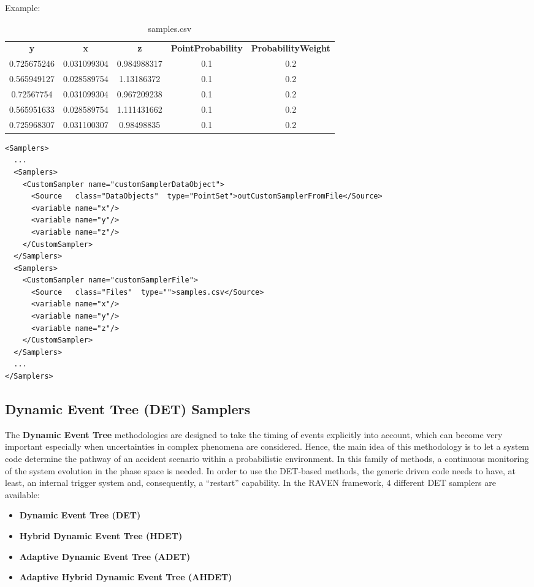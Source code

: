 Example:
\begin{table}[h!]
\centering
\caption{samples.csv}
\begin{tabular}{ccccc}
\textbf{y}  & \textbf{x}  & \textbf{z}  & \textbf{PointProbability} & \textbf{ProbabilityWeight} \\
0.725675246 & 0.031099304 & 0.984988317 & 0.1                       & 0.2                        \\
0.565949127 & 0.028589754 & 1.13186372  & 0.1                       & 0.2                        \\
0.72567754  & 0.031099304 & 0.967209238 & 0.1                       & 0.2                        \\
0.565951633 & 0.028589754 & 1.111431662 & 0.1                       & 0.2                        \\
0.725968307 & 0.031100307 & 0.98498835  & 0.1                       & 0.2
\end{tabular}
\end{table}
\begin{lstlisting}[style=XML]
<Samplers>
  ...
  <Samplers>
    <CustomSampler name="customSamplerDataObject">
      <Source   class="DataObjects"  type="PointSet">outCustomSamplerFromFile</Source>
      <variable name="x"/>
      <variable name="y"/>
      <variable name="z"/>
    </CustomSampler>
  </Samplers>
  <Samplers>
    <CustomSampler name="customSamplerFile">
      <Source   class="Files"  type="">samples.csv</Source>
      <variable name="x"/>
      <variable name="y"/>
      <variable name="z"/>
    </CustomSampler>
  </Samplers>
  ...
</Samplers>
\end{lstlisting}

\subsection{Dynamic Event Tree (DET) Samplers}
\label{subsec:DETSamplers}
The \textbf{Dynamic Event Tree} methodologies are designed to take the timing of
events explicitly into account, which can become very important especially when
uncertainties in complex phenomena are considered.
%
Hence, the main idea of this methodology is to let a system code determine the
pathway of an accident scenario within a probabilistic environment.
%
In this family of methods, a continuous monitoring of the system evolution in
the phase space is needed.
%
In order to use the DET-based methods, the generic driven code needs to have, at
least, an internal trigger system and, consequently, a ``restart'' capability.
%
In the RAVEN framework, 4 different DET samplers are available:
\begin{itemize}
\item \textbf{Dynamic Event Tree (DET)}
\item \textbf{Hybrid Dynamic Event Tree (HDET)}
\item \textbf{Adaptive Dynamic Event Tree (ADET)}
\item \textbf{Adaptive Hybrid Dynamic Event Tree (AHDET)}
\end{itemize}

